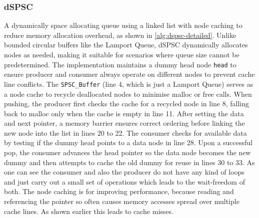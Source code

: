 \subsubsection{\acf{dSPSC}}
A dynamically space allocating queue using a linked list with node caching to reduce memory allocation overhead, as shown in \cref{alg:dspsc-detailed}. Unlike bounded circular buffers like the Lamport Queue, dSPSC dynamically allocates nodes as needed, making it suitable for scenarios where queue size cannot be predetermined. The implementation maintains a dummy head node \texttt{head} to ensure producer and consumer always operate on different nodes to prevent cache line conflicts. The \texttt{SPSC\_Buffer} (line 4, which is just a Lamport Queue) serves as a node cache to recycle deallocated nodes to minimise malloc or free calls. When pushing, the producer first checks the cache for a recycled node in line 8, falling back to malloc only when the cache is empty in line 11. After setting the data and next pointer, a memory barrier ensures correct ordering before linking the new node into the list in lines 20 to 22. The consumer checks for available data by testing if the dummy head points to a data node in line 28. Upon a successful pop, the consumer advances the head pointer so the data node becomes the new dummy and then attempts to cache the old dummy for reuse in lines 30 to 33. As one can see the consumer and also the producer do not have any kind of loops and just carry out a small set of operations which leads to the wait-freedom of both. The node caching is for improving performance, because reading and referencing the pointer so often causes memory accesses spread over multiple cache lines. As shown earlier this leads to cache misses. \cite{torquati2010singleproducersingleconsumerqueuessharedcache}

